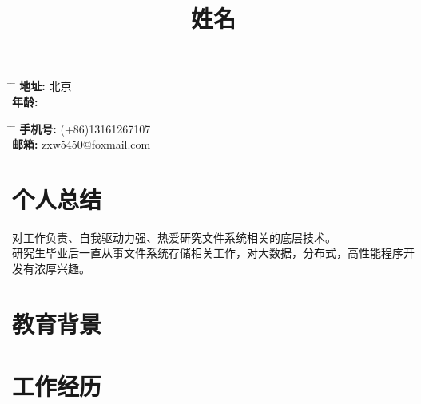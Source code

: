 \documentclass[10pt]{article} %
\begin{document}
\title{姓名}
\parbox{0.5\textwidth}{
\begin{tabbing}
\hspace{2cm} \= \hspace{1cm} \= \kill %
\textbf{地址:} \>北京\\
\textbf{年龄:} 
\end{tabbing}}
\hfill %
\parbox{0.5\textwidth}{
\begin{tabbing}
\hspace{2cm} \= \hspace{1cm} \= \kill %
\textbf{手机号:} \> (+86)13161267107\\ 
\textbf{邮箱:}   \> zxw5450@foxmail.com
\end{tabbing}}

\section{个人总结}
对工作负责、自我驱动力强、热爱研究文件系统相关的底层技术。\\
研究生毕业后一直从事文件系统存储相关工作，对大数据，分布式，高性能程序开发有浓厚兴趣。
\section{教育背景}
\section{工作经历}
\end{document}
